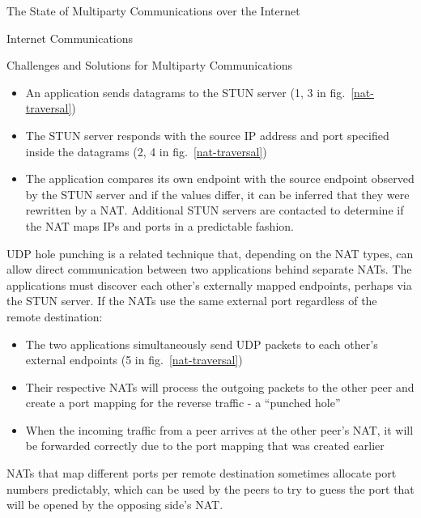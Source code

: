 \begin{frame}[fragile]{The State of Multiparty Communications over the
Internet}
\begin{block}{Internet Communications}
\begin{block}{Challenges and Solutions for Multiparty Communications}
\begin{itemize}
\tightlist
\item
  An application sends  datagrams to the STUN server (1, 3 in
  fig.~\ref{nat-traversal})
\item
  The STUN server responds with the source IP address and port specified
  inside the datagrams (2, 4 in fig.~\ref{nat-traversal})
\item
  The application compares its own endpoint with the source endpoint
  observed by the STUN server and if the values differ, it can be
  inferred that they were rewritten by a NAT. Additional STUN servers
  are contacted to determine if the NAT maps IPs and ports in a
  predictable fashion.
\end{itemize}

UDP hole punching is a related technique that, depending on the NAT
types, can allow direct communication between two applications behind
separate NATs. The applications must discover each other's externally
mapped endpoints, perhaps via the STUN server.  If the
NATs use the same external port regardless of the remote destination:

\begin{itemize}
\tightlist
\item
  The two applications simultaneously send UDP packets to each other's
  external endpoints (5 in fig.~\ref{nat-traversal})
\item
  Their respective NATs will process the outgoing packets to the other
  peer and create a port mapping for the reverse traffic - a ``punched
  hole''
\item
  When the incoming traffic from a peer arrives at the other peer's NAT,
  it will be forwarded correctly due to the port mapping that was
  created earlier
\end{itemize}

NATs that map different ports per remote destination sometimes allocate
port numbers predictably, which can be used by the peers to try to guess
the port that will be opened by the opposing side's NAT.



\end{block}
\end{block}
\end{frame}
